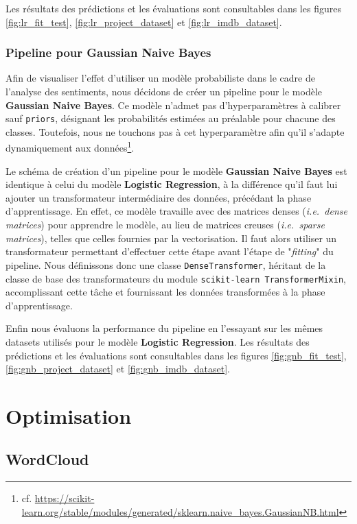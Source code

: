 \documentclass[12pt,a4paper]{report}
\theoremstyle{definition}
\begin{document}
Les résultats des prédictions et les évaluations sont consultables dans les figures \ref{fig:lr_fit_test}, \ref{fig:lr_project_dataset} et \ref{fig:lr_imdb_dataset}.

\subsection{Pipeline pour Gaussian Naive Bayes}
Afin de visualiser l'effet d'utiliser un modèle probabiliste dans le cadre de l'analyse des sentiments, nous décidons de créer un pipeline pour le modèle \textbf{Gaussian Naive Bayes}. Ce modèle n'admet pas d'hyperparamètres à calibrer sauf \texttt{priors}, désignant les probabilités estimées au préalable pour chacune des classes. Toutefois, nous ne touchons pas à cet hyperparamètre afin qu’il s’adapte dynamiquement aux données\footnote{cf. \url{https://scikit-learn.org/stable/modules/generated/sklearn.naive_bayes.GaussianNB.html}}.

Le schéma de création d'un pipeline pour le modèle \textbf{Gaussian Naive Bayes} est identique à celui du modèle \textbf{Logistic Regression}, à la différence qu'il faut lui ajouter un transformateur intermédiaire des données, précédant la phase d'apprentissage. En effet, ce modèle travaille avec des matrices denses (\emph{i.e.~dense matrices}) pour apprendre le modèle, au lieu de matrices creuses (\emph{i.e.~sparse matrices}), telles que celles fournies par la vectorisation. Il faut alors utiliser un transformateur permettant d’effectuer cette étape avant l’étape de "\textit{fitting}" du pipeline. Nous définissons donc une classe \texttt{DenseTransformer}, héritant de la classe de base des transformateurs du module \texttt{scikit-learn TransformerMixin}, accomplissant cette tâche et fournissant les données transformées à la phase d’apprentissage.

Enfin nous évaluons la performance du pipeline en l'essayant sur les mêmes datasets utilisés pour le modèle \textbf{Logistic Regression}. Les résultats des prédictions et les évaluations sont consultables dans les figures \ref{fig:gnb_fit_test}, \ref{fig:gnb_project_dataset} et \ref{fig:gnb_imdb_dataset}.

\chapter{Optimisation}
\section{WordCloud}
\end{document}
